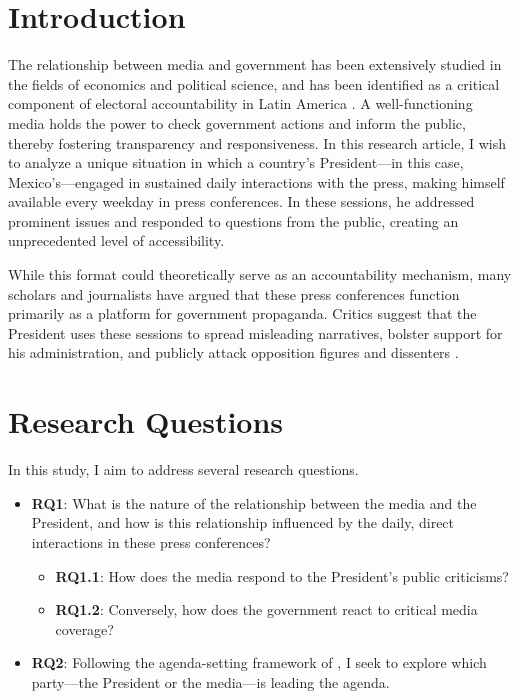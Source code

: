 \documentclass[14]{article}
\begin{document}

\section{Introduction}

The relationship between media and government has been extensively studied in the fields of economics and political science, and has been identified as a critical component of electoral accountability in Latin America \citep{Audits-Ferraz-QJE, PolInfo-Enriquez-JEEA, Marshall}. A well-functioning media holds the power to check government actions and inform the public, thereby fostering transparency and responsiveness. In this research article, I wish to analyze a unique situation in which a country's President—in this case, Mexico’s—engaged in sustained daily interactions with the press, making himself available every weekday in press conferences. In these sessions, he addressed prominent issues and responded to questions from the public, creating an unprecedented level of accessibility.

While this format could theoretically serve as an accountability mechanism, many scholars and journalists have argued that these press conferences function primarily as a platform for government propaganda. Critics suggest that the President uses these sessions to spread misleading narratives, bolster support for his administration, and publicly attack opposition figures and dissenters \citep{OtrosDatos}.

\section{Research Questions}

In this study, I aim to address several research questions. 

\begin{itemize}
    \item \textbf{RQ1}: What is the nature of the relationship between the media and the President, and how is this relationship influenced by the daily, direct interactions in these press conferences?
    \begin{itemize}
        \item \textbf{RQ1.1}: How does the media respond to the President’s public criticisms?
        \item \textbf{RQ1.2}: Conversely, how does the government react to critical media coverage? 
    \end{itemize}
    \item \textbf{RQ2}: Following the agenda-setting framework of \cite{Leads-Nagler-APSR}, I seek to explore which party—the President or the media—is leading the agenda. 
\end{itemize} 
\end{document}
